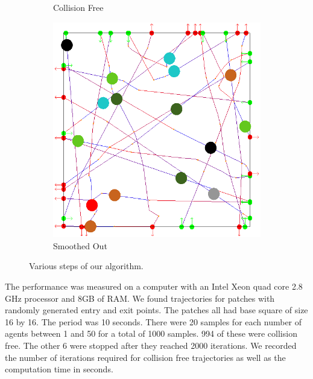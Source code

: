 \begin{figure}[t]
\begin{subfigure}[b]{0.24\linewidth}
 	\caption{Collision Free}
 \end{subfigure}
 \begin{subfigure}[b]{0.24\linewidth}
 	\includegraphics[width=\linewidth]{images/steps-smoothed.png}
 	\caption{Smoothed Out}
 \end{subfigure}
 \caption{Various steps of our algorithm.}
 \label{fig:res:steps}
\end{figure}


The performance was measured on a computer with an Intel Xeon quad core 2.8 GHz processor and 8GB of RAM. We found trajectories for patches with randomly generated entry and exit points. The patches all had base square of size 16 by 16. The period was 10 seconds. There were 20 samples for each number of agents between 1 and 50 for a total of 1000 samples. 994 of these were collision free. The other 6 were stopped after they reached 2000 iterations. We recorded the number of iterations required for collision free trajectories as well as the computation time in seconds.

